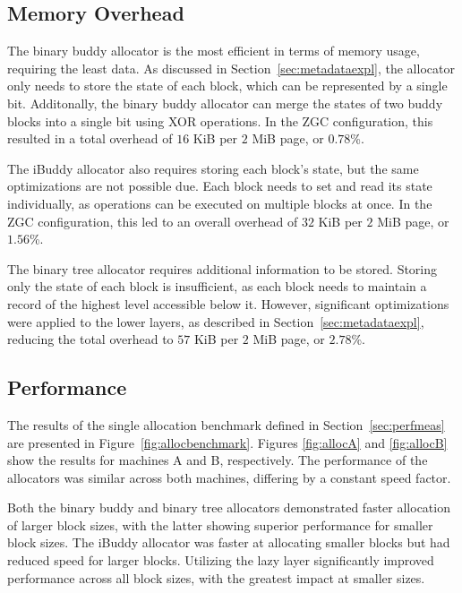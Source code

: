 
\subsection{Memory Overhead}
The binary buddy allocator is the most efficient in terms of memory usage, requiring the least data. As discussed in Section~\ref{sec:metadataexpl}, the allocator only needs to store the state of each block, which can be represented by a single bit. Additonally, the binary buddy allocator can merge the states of two buddy blocks into a single bit using XOR operations. In the ZGC configuration, this resulted in a total overhead of $16$ KiB per $2$ MiB page, or $0.78$\%.

The iBuddy allocator also requires storing each block's state, but the same optimizations are not possible due. Each block needs to set and read its state individually, as operations can be executed on multiple blocks at once. In the ZGC configuration, this led to an overall overhead of $32$ KiB per $2$ MiB page, or $1.56$\%.

The binary tree allocator requires additional information to be stored. Storing only the state of each block is insufficient, as each block needs to maintain a record of the highest level accessible below it. However, significant optimizations were applied to the lower layers, as described in Section~\ref{sec:metadataexpl}, reducing the total overhead to $57$ KiB per $2$ MiB page, or $2.78$\%.

\subsection{Performance}
The results of the single allocation benchmark defined in Section~\ref{sec:perfmeas} are presented in Figure~\ref{fig:allocbenchmark}. Figures \ref{fig:allocA} and \ref{fig:allocB} show the results for machines A and B, respectively. The performance of the allocators was similar across both machines, differing by a constant speed factor.

Both the binary buddy and binary tree allocators demonstrated faster allocation of larger block sizes, with the latter showing superior performance for smaller block sizes. The iBuddy allocator was faster at allocating smaller blocks but had reduced speed for larger blocks. Utilizing the lazy layer significantly improved performance across all block sizes, with the greatest impact at smaller sizes.

